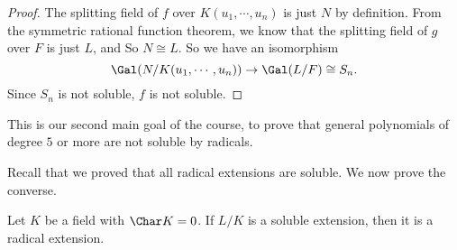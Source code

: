 \documentclass[a4paper]{article}
\begin{document}
\begin{proof}
  The splitting field of $f$ over $K(u_1, \cdots, u_n)$ is just $N$ by definition. From the symmetric rational function theorem, we know that the splitting field of $g$ over $F$ is just $L$, and So $N \cong L$. So we have an isomorphism
  \[
    \Gal(N/K(u_1, \cdots, u_n)) \to \Gal(L/F) \cong S_n.
  \]
  Since $S_n$ is not soluble, $f$ is not soluble.
\end{proof}

This is our second main goal of the course, to prove that general polynomials of degree $5$ or more are not soluble by radicals.

Recall that we proved that all radical extensions are soluble. We now prove the converse.

\begin{thm}
  Let $K$ be a field with $\Char K = 0$. If $L/K$ is a soluble extension, then it is a radical extension.
\end{thm}
\end{document}
